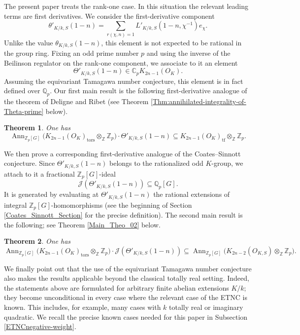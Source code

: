\documentclass[a4paper,11pt]{article}
\newtheorem{theorem}{Theorem}[section]
\begin{document}
\medskip

\noindent The present paper treats the rank-one case. In this situation the relevant
leading terms are first derivatives. We 
consider the first-derivative component
\[
\theta'_{K/k,S}(1-n)
=
\sum_{r(\chi,n)=1}
L'_{K/k,S}(1-n,\chi^{-1})e_\chi .
\]
Unlike the value \(\theta_{K/k,S}(1-n)\), this element is not expected to be
rational in the group ring. Fixing an odd prime number \(p\) and using the inverse of the Beilinson regulator on the
rank-one component, we associate to it an element 
\[
\Theta'_{K/k,S}(1-n)
\in
\mathbb C_pK_{2n-1}(O_K).
\]
Assuming the equivariant Tamagawa number conjecture, this element is in fact
defined over \(\mathbb Q_p\). Our first main result is the following
first-derivative analogue of the theorem of Deligne and Ribet (see Theorem
\ref{Thm:annihilated-integrality-of-Theta-prime} below).

\begin{theorem}
\label{Main_Theo_01_intro}
One has
\[
\operatorname{Ann}_{\mathbb Z_p[G]}
\bigl(K_{2n-1}(O_K)_{\mathrm{tors}}\otimes_{\mathbb Z}\mathbb Z_p\bigr)
\cdot
\Theta'_{K/k,S}(1-n)
\subseteq
K_{2n-1}(O_K)_{\mathrm{tf}}\otimes_\mathbb{Z} \mathbb Z_p.
\]
\end{theorem}

\medskip

\noindent We then prove a corresponding first-derivative analogue of the
Coates--Sinnott conjecture. Since
\(\Theta'_{K/k,S}(1-n)\) belongs to the rationalized odd \(K\)-group, we attach
to it a fractional \(\mathbb Z_p[G]\)-ideal
\[
\mathcal J(\Theta'_{K/k,S}(1-n))
\subseteq
\mathbb Q_p[G].
\]
It is generated by evaluating at \(\Theta'_{K/k,S}(1-n)\) the rational
extensions of integral \(\mathbb Z_p[G]\)-homomorphisms (see the beginning of
Section \ref{Coates_Sinnott_Section} for the precise definition). The second
main result is the following; see Theorem \ref{Main_Theo_02} below.

\begin{theorem}
\label{Main_Theo_02_intro}
One has
\[
\operatorname{Ann}_{\mathbb Z_p[G]}
\bigl(K_{2n-1}(O_K)_{\mathrm{tors}}\otimes_{\mathbb Z}\mathbb Z_p\bigr)
\cdot
\mathcal J(\Theta'_{K/k,S}(1-n))
\subseteq
\operatorname{Ann}_{\mathbb Z_p[G]}
\bigl(K_{2n-2}(O_{K,S})\otimes_\mathbb{Z} \mathbb Z_p\bigr).
\]
\end{theorem}

\medskip

\noindent We finally point out that the use of the equivariant Tamagawa number conjecture
also makes the results applicable beyond the classical totally real setting.
Indeed, the statements above are formulated for arbitrary finite abelian
extensions \(K/k\); they become unconditional in every case where the relevant
case of the ETNC is known. This includes, for example, many cases with \(k\)
totally real or imaginary quadratic. We recall the precise known cases needed
for this paper in Subsection \ref{ETNCnegative-weight}.
\end{document}
